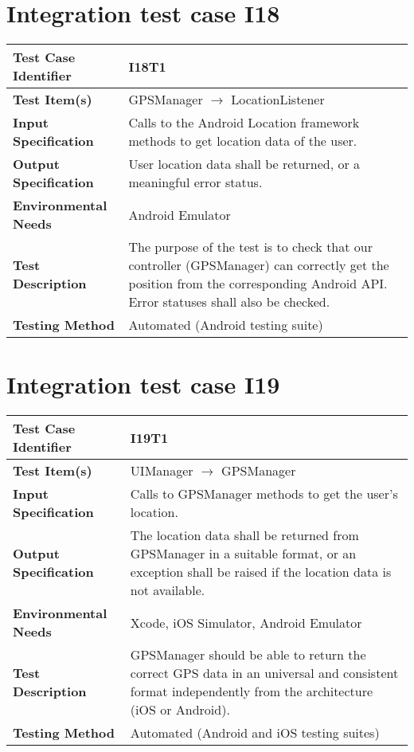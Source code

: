 \vspace{2em}

\section{Integration test case I18}

\begin{tabular}{l p{}}
    \hline
    \textbf{Test Case Identifier} & I18T1\\
    \hline
    \textbf{Test Item(s)} & GPSManager $\rightarrow$ LocationListener \\
    \hline
    \textbf{Input Specification} & Calls to the Android Location framework methods to get location data of the user. \\
    \hline
    \textbf{Output Specification} & User location data shall be returned, or a meaningful error status. \\
    \hline
    \textbf{Environmental Needs} & Android Emulator \\
    \hline
    \textbf{Test Description} & The purpose of the test is to check that our controller (GPSManager) can correctly get the position from the corresponding Android API. Error statuses shall also be checked. \\
    \hline
    \textbf{Testing Method} & Automated (Android testing suite) \\
    \hline
\end{tabular}

\vspace{2em}

\section{Integration test case I19}

\begin{tabular}{l p{}}
    \hline
    \textbf{Test Case Identifier} & I19T1\\
    \hline
    \textbf{Test Item(s)} & UIManager $\rightarrow$ GPSManager \\
    \hline
    \textbf{Input Specification} & Calls to GPSManager methods to get the user's location. \\
    \hline
    \textbf{Output Specification} & The location data shall be returned from GPSManager in a suitable format, or an exception shall be raised if the location data is not available. \\
    \hline
    \textbf{Environmental Needs} & Xcode, iOS Simulator, Android Emulator\\
    \hline
    \textbf{Test Description} & GPSManager should be able to return the correct GPS data in an universal and consistent format independently from the architecture (iOS or Android).\\
    \hline
    \textbf{Testing Method} & Automated (Android and iOS testing suites) \\
    \hline
\end{tabular}

